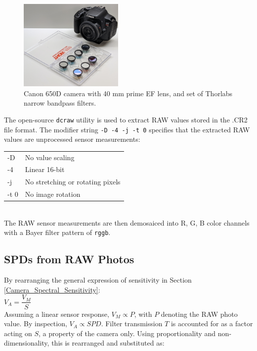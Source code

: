 \documentclass[twocolumn,10pt]{asme2ej}
\newcommand{\id}{\hspace{6 mm}}
\begin{document}
\begin{figure}
\centering
\includegraphics[width=0.45\textwidth]{IMG_20210712_212507_GIMP.jpg}
\caption{Canon 650D camera with 40 mm prime EF lens, and set of Thorlabs narrow bandpass filters.}
\label{canon}
\end{figure}

\id The open-source \texttt{dcraw} utility is used to extract RAW values stored in the .CR2 file format. The modifier string \texttt{-D -4 -j -t 0} specifies that the extracted RAW values are unprocessed sensor measurements:\\

\begin{tabular}{l | l}
-D & No value scaling \\
-4 & Linear 16-bit \\
-j & No stretching or rotating pixels \\
-t 0 & No image rotation \\
\end{tabular} \\

The RAW sensor measurements are then demosaiced into R, G, B color channels with a Bayer filter pattern of \texttt{rggb}.

\subsection{SPDs from RAW Photos}

 By rearranging the general expression of sensitivity in Section \ref{Camera_Spectral_Sensitivity}: \\

 $V_A = \dfrac{V_M}{S}$ \\

Assuming a linear sensor response, $V_M \propto P$, with $P$ denoting the RAW photo value. By inspection, $V_A \propto SPD$. Filter transmission $T$ is accounted for as a factor acting on $S$, a property of the camera only. Using proportionality and non-dimensionality, this is rearranged and substituted as: \\
\end{document}
